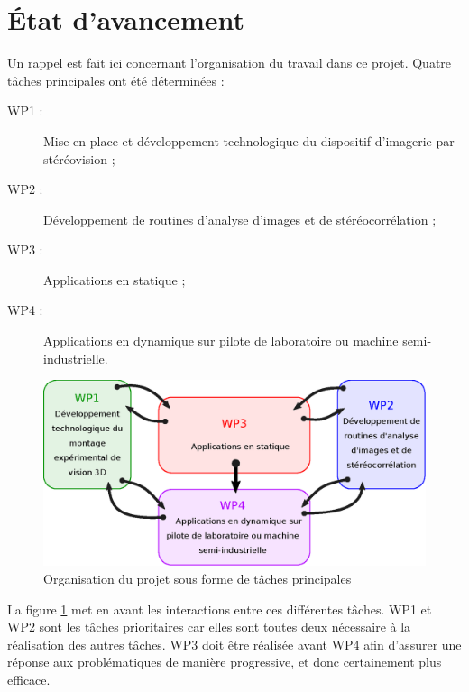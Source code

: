 \documentclass[a4paper, 11pt]{article}
\begin{document}
\section{\'Etat d'avancement}
	Un rappel est fait ici concernant l'organisation du travail dans ce projet. Quatre tâches principales ont été déterminées :
	\begin{description}
		\item[WP1 :] Mise en place et développement technologique du dispositif d’imagerie par stéréovision ;
		\item[WP2 :] Développement de routines d’analyse d’images et de stéréocorrélation ;
		\item[WP3 :] Applications en statique ;
		\item[WP4 :] Applications en dynamique sur pilote de laboratoire ou machine semi-industrielle.
	\end{description}
	\begin{figure}[b]\centering
		\includegraphics[width=.6\linewidth]{taches.eps}
		\caption{\label{fig:taches}Organisation du projet sous forme de tâches principales}
	\end{figure}
	La figure \ref{fig:taches} met en avant les interactions entre ces différentes tâches. WP1 et WP2 sont les tâches prioritaires car elles sont toutes deux nécessaire à la réalisation des autres tâches. WP3 doit être réalisée avant WP4 afin d'assurer une réponse aux problématiques de manière progressive, et donc certainement plus efficace.
\end{document}
